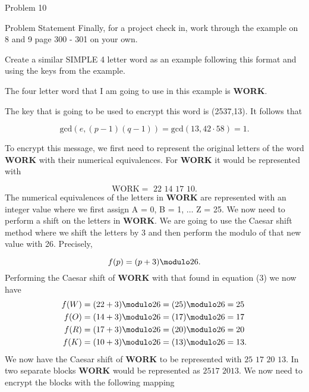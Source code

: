 \begin{problem}{Problem 10}
    \begin{statement}{Problem Statement}
        Finally, for a project check in, work through the example on 8 and 9 page 300 - 301 on your own. \vspace*{1em}

        Create a similar SIMPLE 4 letter word as an example following this format and using the keys from the example.
    \end{statement}

    \begin{Highlight}[Solution]
        The four letter word that I am going to use in this example is \textbf{WORK}. \vspace*{1em}

        The key that is going to be used to encrypt this word is (2537,13). It follows that

        \setcounter{equation}{0}
        \begin{equation}
            \text{gcd}(e,(p-1)(q-1)) = \text{gcd}(13,42 \cdot 58) = 1.
        \end{equation}

        To encrypt this message, we first need to represent the original letters of the word \textbf{WORK} with their numerical equivalences. For \textbf{WORK} it would be represented with

        \begin{equation}
            \text{WORK} = \text{ 22 14 17 10}.
        \end{equation}
        The numerical equivalences of the letters in \textbf{WORK} are represented with an integer value where we first assign A = 0, B = 1, $\dots$ Z = 25. We now need to perform a shift on the letters
        in \textbf{WORK}. We are going to use the Caesar shift method where we shift the letters by 3 and then perform the modulo of that new value with 26. Precisely,

        \begin{equation}
            f(p) = (p + 3) \modulo 26.
        \end{equation}
        Performing the Caesar shift of \textbf{WORK} with that found in equation (3) we now have
        \begin{align}
            f(W) & = (22 + 3) \modulo 26 = (25) \modulo 26 = 25 \\
            f(O) & = (14 + 3) \modulo 26 = (17) \modulo 26 = 17 \\
            f(R) & = (17 + 3) \modulo 26 = (20) \modulo 26 = 20 \\
            f(K) & = (10 + 3) \modulo 26 = (13) \modulo 26 = 13.
        \end{align}
        We now have the Caesar shift of \textbf{WORK} to be represented with $\text{25 17 20 13}$. In two separate blocks \textbf{WORK} would be represented as $\text{2517 2013}$. We now need to
        encrypt the blocks with the following mapping


\end{Highlight}
\end{problem}
